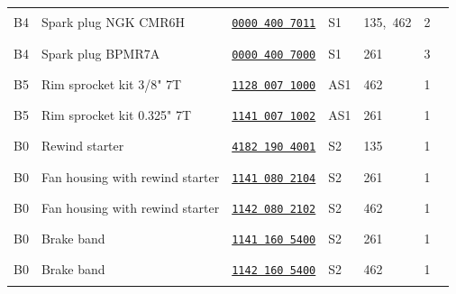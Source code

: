 \documentclass[10pt,letterpaper]{article}
\begin{document}
\begin{longtable}{@{}l>{\raggedright\arraybackslash}p{2.58in}p{1.23in}llrr@{}}
B4 & Spark plug NGK CMR6H & \href{https://rduncangt.github.io/frk-management/parts/00004007011/}{\texttt{0000 400 7011}} & \textcolor{frkSupervision}{S1} & \textcolor{frkApplication}{\mbox{135, 462}} & 2 & \rule{0.23in}{0.3pt}\\

\rowcolor{black!6}B4 & Spark plug BPMR7A & \href{https://rduncangt.github.io/frk-management/parts/00004007000/}{\texttt{0000 400 7000}} & \textcolor{frkSupervision}{S1} & \textcolor{frkApplication}{\mbox{261}} & 3 & \rule{0.23in}{0.3pt}\\

B5 & Rim sprocket kit 3/8" 7T & \href{https://rduncangt.github.io/frk-management/parts/11280071000/}{\texttt{1128 007 1000}} & \textcolor{frkSupervision}{AS1} & \textcolor{frkApplication}{\mbox{462}} & 1 & \rule{0.23in}{0.3pt}\\

\rowcolor{black!6}B5 & Rim sprocket kit 0.325" 7T & \href{https://rduncangt.github.io/frk-management/parts/11410071002/}{\texttt{1141 007 1002}} & \textcolor{frkSupervision}{AS1} & \textcolor{frkApplication}{\mbox{261}} & 1 & \rule{0.23in}{0.3pt}\\

B0 & Rewind starter & \href{https://rduncangt.github.io/frk-management/parts/41821904001/}{\texttt{4182 190 4001}} & \textcolor{frkSupervision}{S2} & \textcolor{frkApplication}{\mbox{135}} & 1 & \rule{0.23in}{0.3pt}\\

\rowcolor{black!6}B0 & Fan housing with rewind starter & \href{https://rduncangt.github.io/frk-management/parts/11410802104/}{\texttt{1141 080 2104}} & \textcolor{frkSupervision}{S2} & \textcolor{frkApplication}{\mbox{261}} & 1 & \rule{0.23in}{0.3pt}\\

B0 & Fan housing with rewind starter & \href{https://rduncangt.github.io/frk-management/parts/11420802102/}{\texttt{1142 080 2102}} & \textcolor{frkSupervision}{S2} & \textcolor{frkApplication}{\mbox{462}} & 1 & \rule{0.23in}{0.3pt}\\

\rowcolor{black!6}B0 & Brake band & \href{https://rduncangt.github.io/frk-management/parts/11411605400/}{\texttt{1141 160 5400}} & \textcolor{frkSupervision}{S2} & \textcolor{frkApplication}{\mbox{261}} & 1 & \rule{0.23in}{0.3pt}\\

B0 & Brake band & \href{https://rduncangt.github.io/frk-management/parts/11421605400/}{\texttt{1142 160 5400}} & \textcolor{frkSupervision}{S2} & \textcolor{frkApplication}{\mbox{462}} & 1 & \label{inventory-last-page}\rule{0.23in}{0.3pt}\\
\bottomrule\end{longtable}
\end{document}
